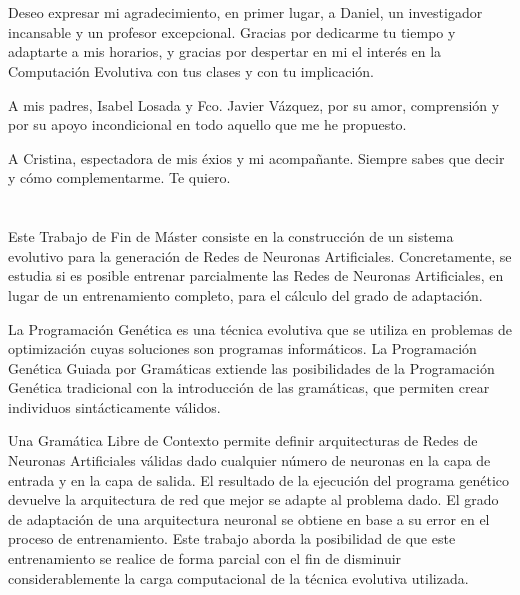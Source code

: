 \documentclass[spanish,a4paper,12pt,twoside]{report}
\begin{document}
  \chapter{\vspace{-3cm}{\LARGE Agradecimientos}}
  \vspace{-1cm}
    Deseo expresar mi agradecimiento, en primer lugar, a Daniel, un investigador incansable y un profesor excepcional. Gracias por dedicarme tu tiempo y adaptarte a mis horarios, y gracias por despertar en mi el interés en la Computación Evolutiva con tus clases y con tu implicación.\par
    A mis padres, Isabel Losada y Fco. Javier Vázquez, por su amor, comprensión y por su apoyo incondicional en todo aquello que me he propuesto.\par
    A Cristina, espectadora de mis éxios y mi acompañante. Siempre sabes que decir y cómo complementarme. Te quiero.
  \vfill
  \newpage\cleardoublepage
  
  \chapter{\vspace{-3cm}{\LARGE Resumen}}
  \vspace{-1cm}
  Este Trabajo de Fin de Máster consiste en la construcción de un sistema evolutivo para la generación de Redes de Neuronas Artificiales. Concretamente, se estudia si es posible entrenar parcialmente las Redes de Neuronas Artificiales, en lugar de un entrenamiento completo, para el cálculo del grado de adaptación. \par
  La Programación Genética es una técnica evolutiva que se utiliza en problemas de optimización cuyas soluciones son programas informáticos. La Programación Genética Guiada por Gramáticas extiende las posibilidades de la Programación Genética tradicional con la introducción de las gramáticas, que permiten crear individuos sintácticamente válidos. \par
  Una Gramática Libre de Contexto permite definir arquitecturas de Redes de Neuronas Artificiales válidas dado cualquier número de neuronas en la capa de entrada y en la capa de salida. El resultado de la ejecución del programa genético devuelve la arquitectura de red que mejor se adapte al problema dado. El grado de adaptación de una arquitectura neuronal se obtiene en base a su error en el proceso de entrenamiento. Este trabajo aborda la posibilidad de que este entrenamiento se realice de forma parcial con el fin de disminuir considerablemente la carga computacional de la técnica evolutiva utilizada. \vfill
  \newpage\cleardoublepage
  
\end{document}
